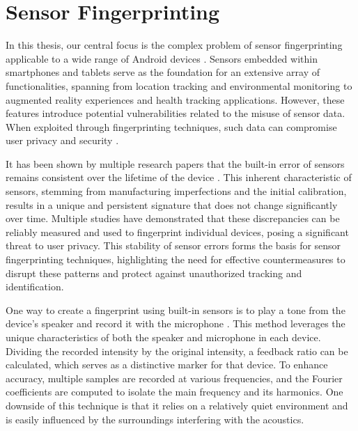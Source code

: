 \documentclass[11pt,
  oneside,openany,    %
]{scrreprt}
\begin{document}
\chapter{Sensor Fingerprinting}
\label{chap:sensor_fingerprint}
In this thesis, our central focus is the complex problem of sensor fingerprinting applicable to a wide range of Android devices \cite{DBLP:journals/comsur/BaldiniS17}. 
Sensors embedded within smartphones and tablets serve as the foundation for an extensive array of functionalities, spanning from location tracking and environmental monitoring to augmented reality experiences and health tracking applications. 
However, these features introduce potential vulnerabilities related to the misuse of sensor data.
When exploited through fingerprinting techniques, such data can compromise user privacy and security \cite{DBLP:conf/ndss/MengZXZZBLTD23}.

It has been shown by multiple research papers that the built-in error of sensors remains consistent over the lifetime of the device \cite{DBLP:conf/sp/ZhangBS19, DBLP:conf/ndss/DeyRXCN14}. 
This inherent characteristic of sensors, stemming from manufacturing imperfections and the initial calibration, results in a unique and persistent signature that does not change significantly over time. 
Multiple studies \cite{DBLP:journals/popets/DasBC18, DBLP:conf/ndss/DasBC16, DBLP:conf/ccs/DasBC14, DBLP:conf/ccs/0001ABP18} have demonstrated that these discrepancies can be reliably measured and used to fingerprint individual devices, posing a significant threat to user privacy. 
This stability of sensor errors forms the basis for sensor fingerprinting techniques, highlighting the need for effective countermeasures to disrupt these patterns and protect against unauthorized tracking and identification.

One way to create a fingerprint using built-in sensors is to play a tone from the device's speaker and record it with the microphone \cite{DBLP:conf/ccs/DasBC14, DBLP:journals/comsur/BaldiniS17}.
This method leverages the unique characteristics of both the speaker and microphone in each device.
Dividing the recorded intensity by the original intensity, a feedback ratio can be calculated, which serves as a distinctive marker for that device.
To enhance accuracy, multiple samples are recorded at various frequencies, and the Fourier coefficients are computed to isolate the main frequency and its harmonics.
One downside of this technique is that it relies on a relatively quiet environment and is easily influenced by the surroundings interfering with the acoustics.
\end{document}
